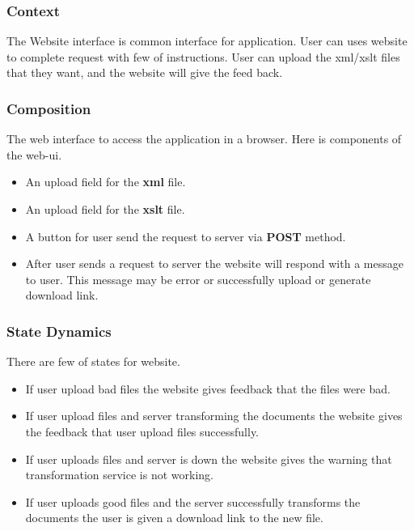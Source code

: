\begin{enmerate}
\begin{itemzie}
\subsubsection{Context}

The Website interface is common interface for application.
User can uses website to complete request with few of instructions.
User can upload the \gls{xml}/\gls{xslt} files that they want, and the website will give the feed back.

\subsubsection{Composition}

The web interface to access the application in a browser.
Here is components of the \gls{web-ui}.

\begin{itemize}
    \item An upload field for the \textbf{\gls{xml}} file.
    \item An upload field for the \textbf{\gls{xslt}} file.
    \item A button for user send the request to server via \textbf{POST} method.
    \item {
       After user sends a request to server the website will respond with a message to user.
        This message may be error or successfully upload or generate download link.
    }
\end{itemize}

\subsubsection{State Dynamics}

There are few of states for website.

\begin{itemize}
    \item If user upload bad files the website gives feedback that the files were bad.
    \item If user upload files and server transforming the documents the website gives the feedback that user upload files successfully.
    \item If user uploads files and server is down the website gives the warning that transformation service is not working.
    \item If user uploads good files and the server successfully transforms the documents the user is given a download link to the new file.
\end{itemize}


\end{itemzie}
\end{enmerate}
